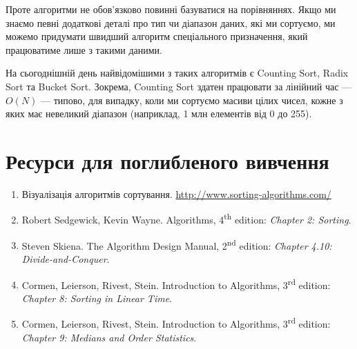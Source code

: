 \documentclass[12pt,a4paper]{report}
\begin{document}
Проте алгоритми не обов’язково повинні базуватися на порівняннях. Якщо ми знаємо певні додаткові деталі про тип чи діапазон даних, які ми сортуємо, ми можемо придумати швидший алгоритм спеціального призначення, який працюватиме лише з такими даними.

На сьогоднішній день найвідомішими з таких алгоритмів є Counting Sort, Radix Sort та Bucket Sort. Зокрема, Counting Sort здатен працювати за лінійний час --- \(O(N)\) --- типово, для випадку, коли ми сортуємо масиви цілих чисел, кожне з яких має невеликий діапазон (наприклад, 1 млн елементів від 0 до 255).



\section*{Ресурси для поглибленого вивчення}
\begin{enumerate}
    \item Візуалізація алгоритмів сортування. \href{http://www.sorting-algorithms.com/}{http://www.sorting-algorithms.com/}
    \item Robert Sedgewick, Kevin Wayne. Algorithms, 4\textsuperscript{th} edition: {\itshape Chapter 2: Sorting}.
    \item Steven Skiena. The Algorithm Design Manual, 2\textsuperscript{nd} edition: {\itshape Chapter 4.10: Divide-and-Conquer}.
    \item Cormen, Leierson, Rivest, Stein. Introduction to Algorithms, 3\textsuperscript{rd} edition: {\itshape Chapter 8: Sorting in Linear Time}.
    \item Cormen, Leierson, Rivest, Stein. Introduction to Algorithms, 3\textsuperscript{rd} edition: {\itshape Chapter 9: Medians and Order Statistics}.
\end{enumerate}
\end{document}

